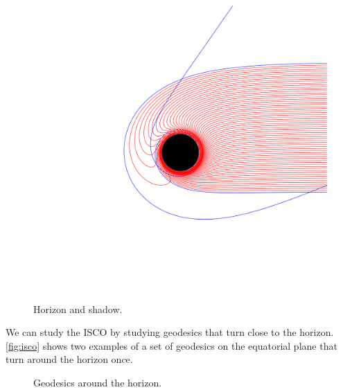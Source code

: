 \begin{figure}[bth]
	\myfloatalign
	\includegraphics[width=.7\linewidth]{gfx/shadow}
	\caption[Horizon and shadow]{Horizon and shadow.}
	\label{fig:virtualshadow}
\end{figure}

We can study the \ac{ISCO} by studying geodesics that turn close to the horizon. \autoref{fig:isco} shows two examples of a set of geodesics on the equatorial plane that turn around the horizon once.

\begin{figure}[bth]
	\myfloatalign
	{} \quad
	{}
	\caption[Geodesics around the horizon]{Geodesics around the horizon.}
	\label{fig:isco}
\end{figure}

